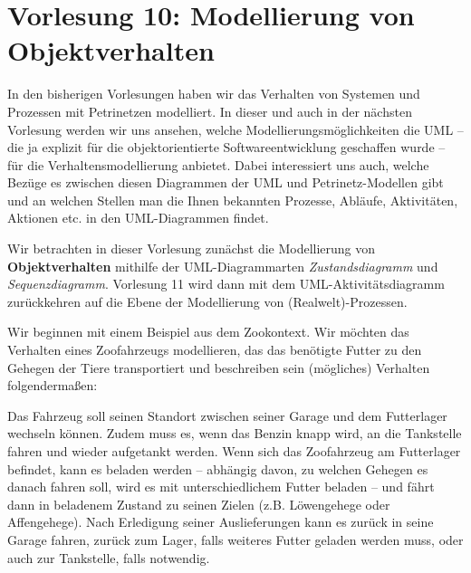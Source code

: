 \section{Vorlesung 10: Modellierung von Objektverhalten}

In den bisherigen Vorlesungen haben wir das Verhalten 
von Systemen und Prozessen mit Petrinetzen modelliert. In dieser und auch in der nächsten Vorlesung werden wir uns ansehen, welche Modellierungsmöglichkeiten die UML -- die ja explizit für die objektorientierte Softwareentwicklung geschaffen wurde -- für die Ver\-haltens\-model\-lierung anbietet. Dabei interessiert uns auch, welche Bezüge es zwischen diesen Diagrammen der UML und Petrinetz-Modellen gibt und an welchen Stellen man die Ihnen bekannten Prozesse, Abläufe, Aktivitäten, Aktionen etc. in den UML-Diagrammen findet.

Wir betrachten in dieser Vorlesung zunächst die Modellierung von \textbf{Objektverhalten} mithilfe der UML-Diagrammarten \textit{Zustandsdiagramm} und \textit{Sequenzdiagramm}. Vorlesung 11 wird dann mit dem UML-Aktivitätsdiagramm zurückkehren auf die Ebene der Modellierung von (Realwelt)-Prozessen.

Wir beginnen mit einem Beispiel aus dem Zookontext. Wir möchten das Verhalten eines Zoofahrzeugs modellieren, das das benötigte Futter zu den Gehegen der Tiere transportiert und beschreiben sein (mögliches) Verhalten folgendermaßen:

\vspace{2mm} %

\begin{addmargin}[25pt]{25pt}
	Das Fahrzeug 
	soll seinen Standort zwischen seiner Garage und dem Futterlager wechseln können. Zudem muss es, wenn das Benzin knapp wird, an die Tankstelle fahren und wieder aufgetankt werden. Wenn sich das Zoofahrzeug am Futterlager befindet, kann es beladen werden -- abhängig davon, zu welchen Gehegen es danach fahren soll, wird es mit unterschiedlichem Futter beladen -- und fährt dann in beladenem Zustand zu seinen Zielen (z.B. Löwengehege oder Affengehege). Nach Erledigung seiner Auslieferungen kann es zurück in seine Garage fahren, zurück zum Lager, falls weiteres Futter geladen werden muss, oder auch zur Tankstelle, falls notwendig.
\end{addmargin}

\vspace{2mm} %

